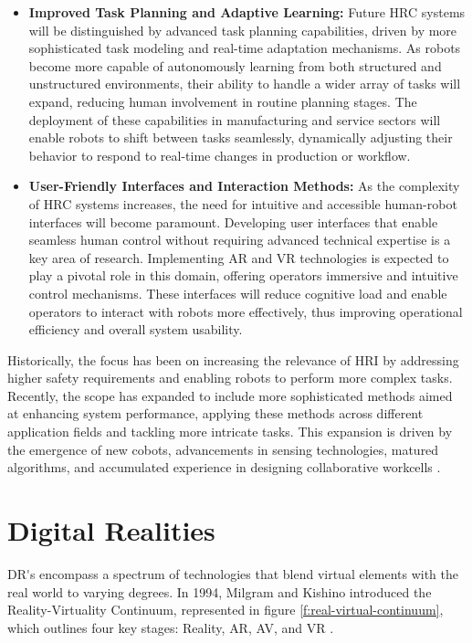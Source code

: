 \begin{itemize}
    \item \textbf{Improved Task Planning and Adaptive Learning:} Future \ac{HRC} systems will be distinguished by advanced task planning capabilities, driven by more sophisticated task modeling and real-time adaptation mechanisms. As robots become more capable of autonomously learning from both structured and unstructured environments, their ability to handle a wider array of tasks will expand, reducing human involvement in routine planning stages. The deployment of these capabilities in manufacturing and service sectors will enable robots to shift between tasks seamlessly, dynamically adjusting their behavior to respond to real-time changes in production or workflow.

    \item \textbf{User-Friendly Interfaces and Interaction Methods:} As the complexity of \ac{HRC} systems increases, the need for intuitive and accessible human-robot interfaces will become paramount. Developing user interfaces that enable seamless human control without requiring advanced technical expertise is a key area of research. Implementing \ac{AR} and \ac{VR} technologies is expected to play a pivotal role in this domain, offering operators immersive and intuitive control mechanisms. These interfaces will reduce cognitive load and enable operators to interact with robots more effectively, thus improving operational efficiency and overall system usability.
\end{itemize}


Historically, the focus has been on increasing the relevance of \ac{HRI} by addressing higher safety requirements and enabling 
robots to perform more complex tasks. Recently, the scope has expanded to include more sophisticated methods aimed at enhancing system performance, 
applying these methods across different application fields and tackling more intricate tasks. This expansion is driven by the emergence of new 
cobots, advancements in sensing technologies, matured algorithms, and accumulated experience in designing collaborative workcells \cite{robotics8040100}.



\section{Digital Realities} 

\ac{DR's} encompass a spectrum of technologies that blend virtual elements with the real world to varying degrees. 
In 1994, Milgram and Kishino introduced the Reality-Virtuality Continuum, represented in figure \ref{f:real-virtual-continuum}, which outlines four key stages: Reality, \ac{AR}, \ac{AV}, and \ac{VR} \cite{milgram1994}.

